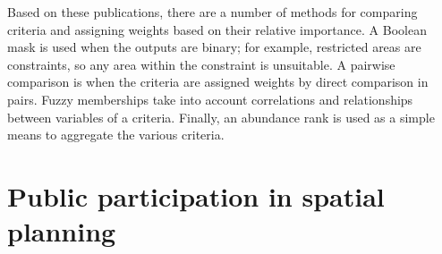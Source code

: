 Based on these publications, there are a number of methods for comparing criteria and assigning weights based on their relative importance. A Boolean mask is used when the outputs are binary; for example, restricted areas are constraints, so any area within the constraint is unsuitable. A pairwise comparison is when the criteria are assigned weights by direct comparison in pairs. Fuzzy memberships take into account correlations and relationships between variables of a criteria. Finally, an abundance rank is used as a simple means to aggregate the various criteria.

\section{Public participation in spatial planning}
